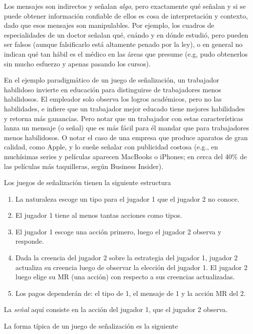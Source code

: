 \documentclass[12pt]{article}
\begin{document}
Los mensajes son indirectos y señalan \textit{algo}, pero exactamente qué señalan y si se puede obtener información confiable de ellos es cosa de interpretación y contexto, dado que esos mensajes son manipulables. Por ejemplo, los cuadros de especialidades de un doctor señalan qué, cuándo y en dónde estudió, pero pueden ser falsos (aunque falsificarlo está altamente penado por la ley), o en general no indican qué tan hábil es el médico en las áreas que presume (e.g, pudo obtenerlos sin mucho esfuerzo y apenas pasando los cursos).

En el ejemplo paradigmático de un juego de señalización, un trabajador habilidoso invierte en educación para distinguirse de trabajadores menos habilidosos. El empleador solo observa los logros académicos, pero no las habilidades, e infiere que un trabajador mejor educado tiene mejores habilidades y retorna más ganancias. Pero notar que un trabajador con estas características lanza un mensaje (o señal) que es más fácil para él mandar que para trabajadores menos habilidosos. O notar el caso de una empresa que produce aparatos de gran calidad, como Apple, y lo sueñe señalar con publicidad costosa (e.g., en muchísimas series y películas aparecen MacBooks o iPhones; en cerca del 40\% de las películas más taquilleras, según Business Insider).

Los juegos de señalización tienen la siguiente estructura

\begin{enumerate}
	\setlength{\itemsep}{0pt}
	\setlength{\parskip}{0pt}
	\setlength{\parsep}{0pt}
	\item La naturaleza escoge un tipo para el jugador 1 que el jugador 2 no conoce.
	\item El jugador 1 tiene al menos tantas acciones como tipos.
	\item El jugador 1 escoge una acción primero, luego el jugador 2 observa y responde.
	\item Dada la creencia del jugador 2 sobre la estrategia del jugador 1, jugador 2 actualiza su creencia luego de observar la elección del jugador 1. El jugador 2 luego elige su MR (una acción) con respecto a sus creencias actualizadas.
	\item Los pagos dependerán de: el tipo de 1, el mensaje de 1 y la acción MR del 2.
\end{enumerate}

La \textit{señal} aquí consiste en la acción del jugador 1, que el jugador 2 observa.

La forma típica de un juego de señalización es la siguiente
\end{document}
